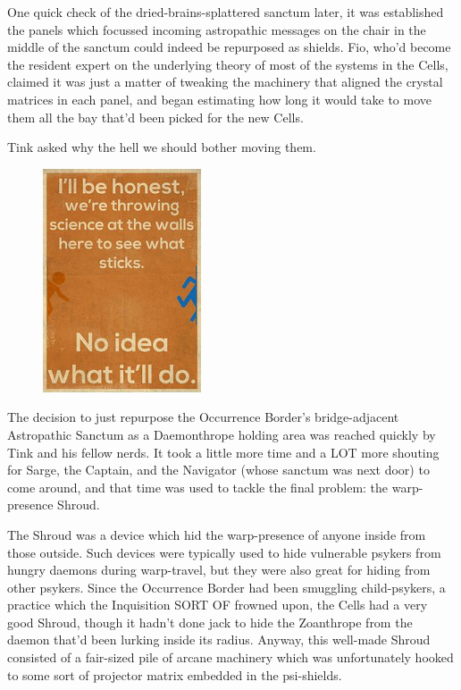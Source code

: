 One quick check of the dried-brains-splattered sanctum later, it was established the panels which focussed incoming astropathic messages on the chair in the middle of the sanctum could indeed be repurposed as shields. 
Fio, who'd become the resident expert on the underlying theory of most of the systems in the Cells, claimed it was just a matter of tweaking the machinery that aligned the crystal matrices in each panel, and began estimating how long it would take to move them all the bay that'd been picked for the new Cells. 


Tink asked why the hell we should bother moving them.

\begin{figure}
	\begin{center}
		\includegraphics[width=\figwidth]{pics/15/45.png}
	\end{center}
\end{figure}
The decision to just repurpose the Occurrence Border's bridge-adjacent Astropathic Sanctum as a Daemonthrope holding area was reached quickly by Tink and his fellow nerds. 
It took a little more time and a LOT more shouting for Sarge, the Captain, and the Navigator (whose sanctum was next door) to come around, and that time was used to tackle the final problem: 
the warp-presence Shroud.

The Shroud was a device which hid the warp-presence of anyone inside from those outside. 
Such devices were typically used to hide vulnerable psykers from hungry daemons during warp-travel, but they were also great for hiding from other psykers. 
Since the Occurrence Border had been smuggling child-psykers, a practice which the Inquisition SORT OF frowned upon, the Cells had a very good Shroud, though it hadn't done jack to hide the Zoanthrope from the daemon that'd been lurking inside its radius. 
Anyway, this well-made Shroud consisted of a fair-sized pile of arcane machinery which was unfortunately hooked to some sort of projector matrix embedded in the psi-shields.

